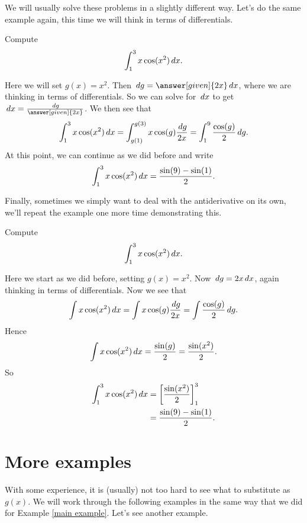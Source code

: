 \documentclass{ximera}
\begin{document}
We will usually solve these problems in a slightly different way. Let's do the same
example again, this time we will think in terms of differentials.

\begin{example}\label{main example}
Compute
\[
\int_1^3 x\cos(x^2)\,d x.
\]
\begin{explanation}
Here we will set $g(x) = x^2$. Then $\d g =  \answer[given]{2x} \d x$, where we are thinking in terms
of differentials. So we can solve for $\,d x$ to get $\d x = \frac{\d g}{\answer[given]{2x}}$.  We then see that
\[
\int_1^3 x \cos(x^2) \,d x = \int_{g(1)}^{g(3)} x \cos(g) \frac{\,d g}{2x} = \int_{1}^{9} \frac{\cos(g)}{2}\,d g .
\]
At this point, we can continue as we did before and write
\[
\int_1^3 x\cos(x^2)\,d x= \frac{\sin(9) -\sin(1)}{2}.
\]
\end{explanation}
\end{example}

Finally, sometimes we simply want to deal with the antiderivative on
its own, we'll repeat the example one more time demonstrating this.

\begin{example}
Compute
\[
\int_1^3 x\cos(x^2)\,d x.
\]
\begin{explanation}
Here we start as we did before, setting $g(x)=x^2$. Now $\,d g =  2x \,d x$,
again thinking in terms of differentials. Now we see that
\[
\int x \cos(x^2) \,d x = \int x \cos(g) \frac{\,d g}{2x} = \int \frac{\cos(g)}{2}\,d g .
\]
Hence 
\[
\int x\cos(x^2)\,d x = \frac{\sin(g)}{2} = \frac{\sin(x^2)}{2}.
\]
So
\begin{align*}
\int_1^3 x\cos(x^2)\,d x &=\bigg[ \frac{\sin(x^2)}{2} \bigg]_1^3\\
&= \frac{\sin(9) -\sin(1)}{2}.
\end{align*}
\end{explanation}
\end{example}

\section{More examples}

With some experience, it is (usually) not too hard to see what to
substitute as $g(x)$.  We will work through the following examples in
the same way that we did for Example \ref{main example}. Let's see
another example.
\end{document}
